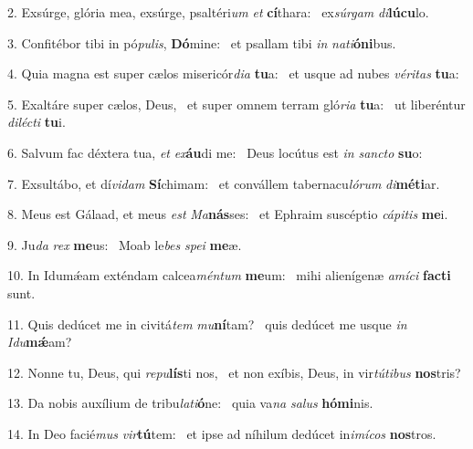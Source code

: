 2. Exsúrge, glória mea, exsúrge, psaltéri\textit{um} \textit{et} \textbf{cí}thara: \ast\  ex\textit{súr}\textit{gam} \textit{di}\textbf{lú}\textbf{cu}lo.\

3. Confitébor tibi in pó\textit{pu}\textit{lis}, \textbf{Dó}mine: \ast\  et psallam tibi \textit{in} \textit{na}\textit{ti}\textbf{ó}\textbf{ni}bus.\

4. Quia magna est super cælos misericór\textit{di}\textit{a} \textbf{tu}a: \ast\  et usque ad nubes \textit{vé}\textit{ri}\textit{tas} \textbf{tu}a:\

5. Exaltáre super cælos, Deus, \dag\  et super omnem terram gló\textit{ri}\textit{a} \textbf{tu}a: \ast\  ut liberéntur \textit{di}\textit{léc}\textit{ti} \textbf{tu}i.\

6. Salvum fac déxtera tua, \textit{et} \textit{ex}\textbf{áu}di me: \ast\  Deus locútus est \textit{in} \textit{sanc}\textit{to} \textbf{su}o:\

7. Exsultábo, et dí\textit{vi}\textit{dam} \textbf{Sí}chimam: \ast\  et convállem tabernacu\textit{ló}\textit{rum} \textit{di}\textbf{mé}\textbf{ti}ar.\

8. Meus est Gálaad, et meus \textit{est} \textit{Ma}\textbf{nás}ses: \ast\  et Ephraim suscéptio \textit{cá}\textit{pi}\textit{tis} \textbf{me}i.\

9. Ju\textit{da} \textit{rex} \textbf{me}us: \ast\  Moab le\textit{bes} \textit{spe}\textit{i} \textbf{me}æ.\

10. In Idumǽam exténdam calcea\textit{mén}\textit{tum} \textbf{me}um: \ast\  mihi alienígenæ \textit{a}\textit{mí}\textit{ci} \textbf{fac}\textbf{ti} sunt.\

11. Quis dedúcet me in civitá\textit{tem} \textit{mu}\textbf{ní}tam? \ast\  quis dedúcet me usque \textit{in} \textit{I}\textit{du}\textbf{mǽ}am?\

12. Nonne tu, Deus, qui \textit{re}\textit{pu}\textbf{lís}ti nos, \ast\  et non exíbis, Deus, in vir\textit{tú}\textit{ti}\textit{bus} \textbf{nos}tris?\

13. Da nobis auxílium de tribu\textit{la}\textit{ti}\textbf{ó}ne: \ast\  quia va\textit{na} \textit{sa}\textit{lus} \textbf{hó}\textbf{mi}nis.\

14. In Deo facié\textit{mus} \textit{vir}\textbf{tú}tem: \ast\  et ipse ad níhilum dedúcet in\textit{i}\textit{mí}\textit{cos} \textbf{nos}tros.\

